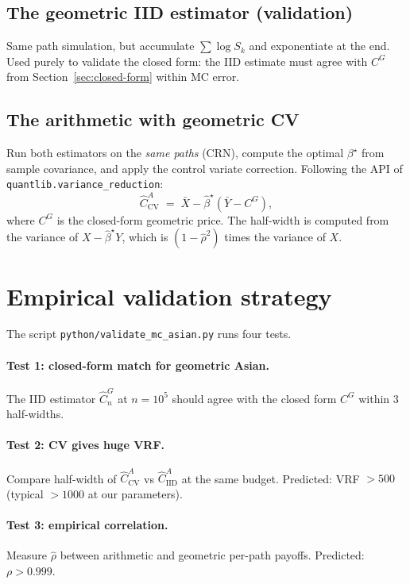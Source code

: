 \documentclass[11pt,a4paper]{article}
\theoremstyle{plain}
\theoremstyle{definition}
\theoremstyle{remark}
\begin{document}
\subsection{The geometric IID estimator (validation)}

Same path simulation, but accumulate $\sum \log S_k$ and exponentiate
at the end. Used purely to validate the closed form: the IID estimate
must agree with $C^G$ from Section~\ref{sec:closed-form} within MC
error.

\subsection{The arithmetic with geometric CV}

Run both estimators on the \emph{same paths} (CRN), compute the
optimal $\beta^\star$ from sample covariance, and apply the control
variate correction. Following the API of
\texttt{quantlib.variance\_reduction}:
\begin{equation}
\hat C^A_{\mathrm{CV}}
\;=\; \bar X - \hat\beta^\star (\bar Y - C^G),
\end{equation}
where $C^G$ is the closed-form geometric price. The half-width is
computed from the variance of $X - \hat\beta^\star Y$, which is
$(1 - \hat\rho^2)$ times the variance of $X$.

\section{Empirical validation strategy}
\label{sec:validation}

The script \texttt{python/validate\_mc\_asian.py} runs four tests.

\paragraph{Test 1: closed-form match for geometric Asian.} The IID
estimator $\hat C^G_n$ at $n = 10^5$ should agree with the closed
form $C^G$ within $3$ half-widths.

\paragraph{Test 2: CV gives huge VRF.} Compare half-width of
$\hat C^A_{\mathrm{CV}}$ vs $\hat C^A_{\mathrm{IID}}$ at the same
budget. Predicted: VRF $> 500$ (typical $> 1000$ at our parameters).

\paragraph{Test 3: empirical correlation.} Measure $\hat \rho$
between arithmetic and geometric per-path payoffs. Predicted:
$\rho > 0.999$.
\end{document}

